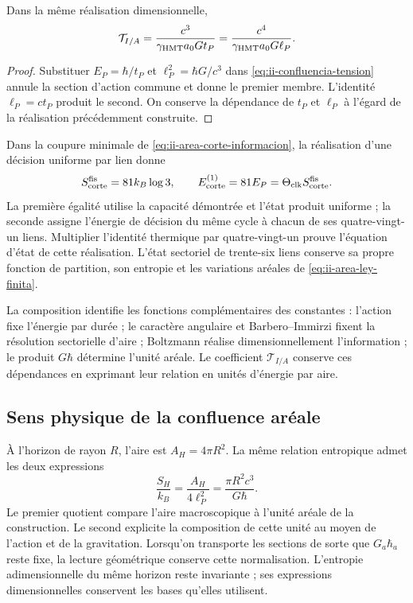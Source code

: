 \begin{proposition}
\label{prop:ii-confluencia-tension}
Dans la même réalisation dimensionnelle,
\begin{equation}
 \mathcal T_{I/A}
 =\frac{c^3}{\gamma_{\mathrm{HMT}}a_0G t_P}
 =\frac{c^4}{\gamma_{\mathrm{HMT}}a_0G\ell_P}.
 \label{eq:ii-confluencia-tension-gravedad}
\end{equation}
\end{proposition}
\begin{proof}
Substituer \(E_P=\hbar/t_P\) et \(\ell_P^2=\hbar G/c^3\)
dans \eqref{eq:ii-confluencia-tension} annule la section d’action
commune et donne le premier membre. L’identité \(\ell_P=ct_P\)
produit le second. On conserve la dépendance de \(t_P\) et
\(\ell_P\) à l’égard de la réalisation précédemment construite.
\end{proof}

Dans la coupure minimale de \eqref{eq:ii-area-corte-informacion}, la
réalisation d’une décision uniforme par lien donne
\begin{equation}
 S_{\rm corte}^{\rm fis}=81k_B\log3,
 \qquad
 E_{\rm corte}^{(1)}=81E_P
 =\Theta_{\rm clk}S_{\rm corte}^{\rm fis}.
 \label{eq:ii-confluencia-corte-energia}
\end{equation}
La première égalité utilise la capacité démontrée et l’état produit
uniforme ; la seconde assigne l’énergie de décision du même cycle à
chacun de ses quatre-vingt-un liens. Multiplier l’identité thermique
par quatre-vingt-un prouve l’équation d’état de cette réalisation.
L’état sectoriel de trente-six liens conserve sa propre
fonction de partition, son entropie et les variations aréales de
\eqref{eq:ii-area-ley-finita}.

La composition identifie les fonctions complémentaires des
constantes : l’action fixe l’énergie par durée ; le caractère angulaire
et Barbero--Immirzi fixent la résolution sectorielle d’aire ; Boltzmann
réalise dimensionnellement l’information ; le produit \(G\hbar\)
détermine l’unité aréale. Le coefficient \(\mathcal T_{I/A}\)
conserve ces dépendances en exprimant leur relation en unités
d’énergie par aire.

\subsection{Sens physique de la confluence aréale}

À l’horizon de rayon \(R\), l’aire est \(A_H=4\pi R^2\).
La même relation entropique admet les deux expressions
\[
 \frac{S_H}{k_B}=\frac{A_H}{4\ell_P^2}
 =\frac{\pi R^2c^3}{G\hbar}.
\]
Le premier quotient compare l’aire macroscopique à l’unité aréale
de la construction. Le second explicite la composition de cette unité
au moyen de l’action et de la gravitation. Lorsqu’on transporte les sections de sorte
que \(G_a\hbar_a\) reste fixe, la lecture géométrique conserve
cette normalisation. L’entropie adimensionnelle du même horizon reste
invariante ; ses expressions dimensionnelles conservent les bases qu’elles
utilisent.

